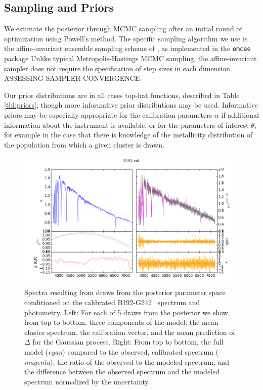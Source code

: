 \documentclass[iop,numberedappendix]{emulateapj}
\newcommand{\excluster}{B192-G242}
\begin{document}
\subsection{Sampling and Priors}

We estimate the posterior through MCMC sampling after an initial round
of optimization using Powell's method.  The specific sampling
algorithm we use is the affine-invariant ensemble sampling scheme of
\citet{goodman}, as implemented in the \texttt{emcee} package \citep{emcee}
Unlike typical Metropolis-Hastings MCMC sampling, the affine-invariant
sampler does not require the specification of step sizes in each
dimension.  {\color{blue}ASSESSING SAMPLER CONVERGENCE}
 
Our prior distributions are in all cases top-hat functions, described
in Table \ref{tbl:priors}, though more informative prior distributions
may be used.  Informative priors may be especially appropriate for the
calibration parameters $\alpha$ if additional information about the
instrument is available; or for the parameters of interest $\theta$,
for example in the case that there is knowledge of the metallicity
distribution of the population from which a given cluster is drawn.



\begin{figure}[h!]
\includegraphics[width=\textwidth]{figures/sfig_b192-g242_225_cal.png}
\caption{Spectra resulting from draws from the posterior parameter
space conditioned on the calibrated \excluster~ spectrum and
photometry.  Left: For each of 5 draws from the posterior we show from
top to bottom, three components of the model: the mean cluster
spectrum, the calibration vector, and the mean prediction of $\Delta$
for the Gaussian process.  Right: From top to bottom, the full model
({\it cyan}) compared to the observed, calibrated spectrum ({\it
magenta}), the ratio of the observed to the modeled spectrum, and the
difference between the observed spectrum and the modeled spectrum
normalized by the uncertainty.
\label{fig:inferred_spectrum}}
\end{figure}
\end{document}

